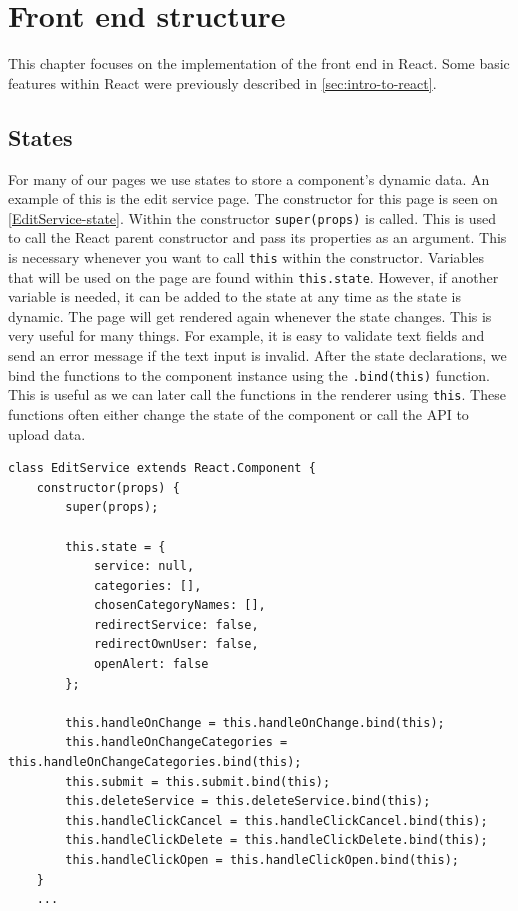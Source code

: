 \section{Front end structure}
This chapter focuses on the implementation of the front end in React.
Some basic features within React were previously described in \autoref{sec:intro-to-react}.

\subsection{States}
For many of our pages we use states to store a component's dynamic data. 
An example of this is the edit service page. 
The constructor for this page is seen on \autoref{EditService-state}.
Within the constructor \texttt{super(props)} is called. 
This is used to call the React parent constructor and pass its properties as an argument.
This is necessary whenever you want to call \texttt{this} within the constructor.
Variables that will be used on the page are found within \texttt{this.state}. 
However, if another variable is needed, it can be added to the state at any time as the state is dynamic.
The page will get rendered again whenever the state changes. 
This is very useful for many things. 
For example, it is easy to validate text fields and send an error message if the text input is invalid.  
After the state declarations, we bind the functions to the component instance using the \texttt{.bind(this)} function.
This is useful as we can later call the functions in the renderer using \texttt{this}.
These functions often either change the state of the component or call the API to upload data.
\begin{lstlisting}[caption={Constructor and state for edit service}, captionpos=b, label={EditService-state}]
class EditService extends React.Component {
    constructor(props) {
        super(props);
    
        this.state = {
            service: null,
            categories: [],
            chosenCategoryNames: [],
            redirectService: false,
            redirectOwnUser: false,
            openAlert: false
        };
            
        this.handleOnChange = this.handleOnChange.bind(this);
        this.handleOnChangeCategories = this.handleOnChangeCategories.bind(this);
        this.submit = this.submit.bind(this);
        this.deleteService = this.deleteService.bind(this);
        this.handleClickCancel = this.handleClickCancel.bind(this);
        this.handleClickDelete = this.handleClickDelete.bind(this);
        this.handleClickOpen = this.handleClickOpen.bind(this);
    }
    ...
\end{lstlisting}

